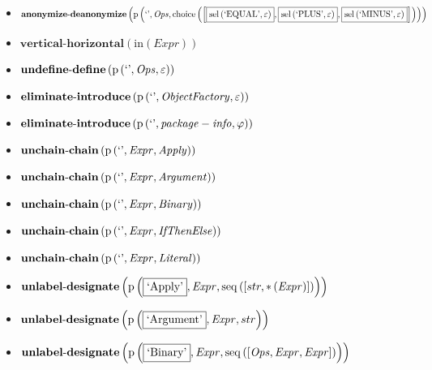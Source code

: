{\begin{itemize}
\item $\mathbf{anonymize\text{-}deanonymize}\\\left(\mathrm{p}\left(\text{`'},\mathit{Ops},\mathrm{choice}\left(\left[\fbox{$\mathrm{sel}\left(\text{`EQUAL'},\varepsilon\right)$}, \fbox{$\mathrm{sel}\left(\text{`PLUS'},\varepsilon\right)$}, \fbox{$\mathrm{sel}\left(\text{`MINUS'},\varepsilon\right)$}\right]\right)\right)\right)$
\item $\mathbf{vertical\text{-}horizontal}\left(\mathrm{in}(Expr)\right)$
\item $\mathbf{undefine\text{-}define}\\\left(\mathrm{p}\left(\text{`'},\mathit{Ops},\varepsilon\right)\right)$
\item $\mathbf{eliminate\text{-}introduce}\\\left(\mathrm{p}\left(\text{`'},\mathit{ObjectFactory},\varepsilon\right)\right)$
\item $\mathbf{eliminate\text{-}introduce}\\\left(\mathrm{p}\left(\text{`'},\mathit{package-info},\varphi\right)\right)$
\item $\mathbf{unchain\text{-}chain}\\\left(\mathrm{p}\left(\text{`'},\mathit{Expr},\mathit{Apply}\right)\right)$
\item $\mathbf{unchain\text{-}chain}\\\left(\mathrm{p}\left(\text{`'},\mathit{Expr},\mathit{Argument}\right)\right)$
\item $\mathbf{unchain\text{-}chain}\\\left(\mathrm{p}\left(\text{`'},\mathit{Expr},\mathit{Binary}\right)\right)$
\item $\mathbf{unchain\text{-}chain}\\\left(\mathrm{p}\left(\text{`'},\mathit{Expr},\mathit{IfThenElse}\right)\right)$
\item $\mathbf{unchain\text{-}chain}\\\left(\mathrm{p}\left(\text{`'},\mathit{Expr},\mathit{Literal}\right)\right)$
\item $\mathbf{unlabel\text{-}designate}\\\left(\mathrm{p}\left(\fbox{\text{`Apply'}},\mathit{Expr},\mathrm{seq}\left(\left[str, {*}\left(\mathit{Expr}\right)\right]\right)\right)\right)$
\item $\mathbf{unlabel\text{-}designate}\\\left(\mathrm{p}\left(\fbox{\text{`Argument'}},\mathit{Expr},str\right)\right)$
\item $\mathbf{unlabel\text{-}designate}\\\left(\mathrm{p}\left(\fbox{\text{`Binary'}},\mathit{Expr},\mathrm{seq}\left(\left[\mathit{Ops}, \mathit{Expr}, \mathit{Expr}\right]\right)\right)\right)$

\end{itemize}}
